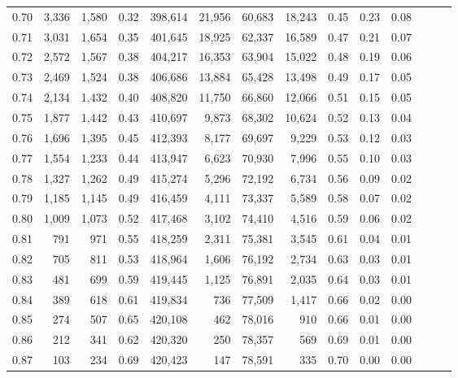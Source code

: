 \begin{tabular}{rrrrrrrrrrrrrr}
0.70 &   3,336 &  1,580 &  0.32 &  398,614 &   21,956 &  60,683 &  18,243 &  0.45 &  0.23 &      0.08 \\
0.71 &   3,031 &  1,654 &  0.35 &  401,645 &   18,925 &  62,337 &  16,589 &  0.47 &  0.21 &      0.07 \\
0.72 &   2,572 &  1,567 &  0.38 &  404,217 &   16,353 &  63,904 &  15,022 &  0.48 &  0.19 &      0.06 \\
0.73 &   2,469 &  1,524 &  0.38 &  406,686 &   13,884 &  65,428 &  13,498 &  0.49 &  0.17 &      0.05 \\
0.74 &   2,134 &  1,432 &  0.40 &  408,820 &   11,750 &  66,860 &  12,066 &  0.51 &  0.15 &      0.05 \\
0.75 &   1,877 &  1,442 &  0.43 &  410,697 &    9,873 &  68,302 &  10,624 &  0.52 &  0.13 &      0.04 \\
0.76 &   1,696 &  1,395 &  0.45 &  412,393 &    8,177 &  69,697 &   9,229 &  0.53 &  0.12 &      0.03 \\
0.77 &   1,554 &  1,233 &  0.44 &  413,947 &    6,623 &  70,930 &   7,996 &  0.55 &  0.10 &      0.03 \\
0.78 &   1,327 &  1,262 &  0.49 &  415,274 &    5,296 &  72,192 &   6,734 &  0.56 &  0.09 &      0.02 \\
0.79 &   1,185 &  1,145 &  0.49 &  416,459 &    4,111 &  73,337 &   5,589 &  0.58 &  0.07 &      0.02 \\
0.80 &   1,009 &  1,073 &  0.52 &  417,468 &    3,102 &  74,410 &   4,516 &  0.59 &  0.06 &      0.02 \\
0.81 &     791 &    971 &  0.55 &  418,259 &    2,311 &  75,381 &   3,545 &  0.61 &  0.04 &      0.01 \\
0.82 &     705 &    811 &  0.53 &  418,964 &    1,606 &  76,192 &   2,734 &  0.63 &  0.03 &      0.01 \\
0.83 &     481 &    699 &  0.59 &  419,445 &    1,125 &  76,891 &   2,035 &  0.64 &  0.03 &      0.01 \\
0.84 &     389 &    618 &  0.61 &  419,834 &      736 &  77,509 &   1,417 &  0.66 &  0.02 &      0.00 \\
0.85 &     274 &    507 &  0.65 &  420,108 &      462 &  78,016 &     910 &  0.66 &  0.01 &      0.00 \\
0.86 &     212 &    341 &  0.62 &  420,320 &      250 &  78,357 &     569 &  0.69 &  0.01 &      0.00 \\
0.87 &     103 &    234 &  0.69 &  420,423 &      147 &  78,591 &     335 &  0.70 &  0.00 &      0.00 \\

\end{tabular}
